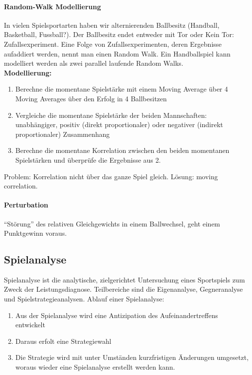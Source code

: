 \paragraph{Random-Walk Modellierung}
In vielen Spielsportarten haben wir alternierenden Ballbesitz (Handball, Basketball, Fussball?).
Der Ballbesitz endet entweder mit Tor oder Kein Tor: Zufallsexperiment.
Eine Folge von Zufallsexperimenten, deren Ergebnisse aufaddiert werden, nennt man einen Random Walk.
Ein Handballspiel kann modelliert werden als zwei parallel laufende Random Walks.\\
\textbf{Modellierung:}\\
\begin{enumerate}
  \vspace{-1em}
  \item Berechne die momentane Spielstärke mit einem Moving Average über 4 Moving Averages über den Erfolg in 4 Ballbesitzen
  \item Vergleiche die momentane Spielstärke der beiden Mannschaften: unabhängiger, positiv (direkt proportionaler) oder negativer (indirekt proportionaler) Zusammenhang
  \item Berechne die momentane Korrelation zwischen den beiden momentanen Spielstärken und überprüfe die Ergebnisse aus 2.
\end{enumerate}
Problem: Korrelation nicht über das ganze Spiel gleich.
Lösung: moving correlation.
\paragraph{Perturbation} ``Störung'' des relativen Gleichgewichts in einem Ballwechsel,
geht einem Punktgewinn voraus.

\subsection{Spielanalyse}
Spielanalyse ist die analytische, zielgerichtet Untersuchung eines Sportspiels zum Zweck der Leistungsdiagnose.
Teilbereiche sind die Eigenanalyse, Gegneranalyse und Spielstrategieanalysen.
Ablauf einer Spielanalyse:
\begin{enumerate}
  \item Aus der Spielanalyse wird eine Antizipation des Aufeinandertreffens entwickelt
  \item Daraus erfolt eine Strategiewahl
  \item Die Strategie wird mit unter Umständen kurzfristigen Änderungen umgesetzt, woraus wieder eine Spielanalyse erstellt werden kann.
\end{enumerate}
